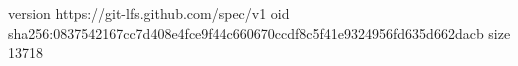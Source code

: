 version https://git-lfs.github.com/spec/v1
oid sha256:0837542167cc7d408e4fce9f44c660670ccdf8c5f41e9324956fd635d662dacb
size 13718
